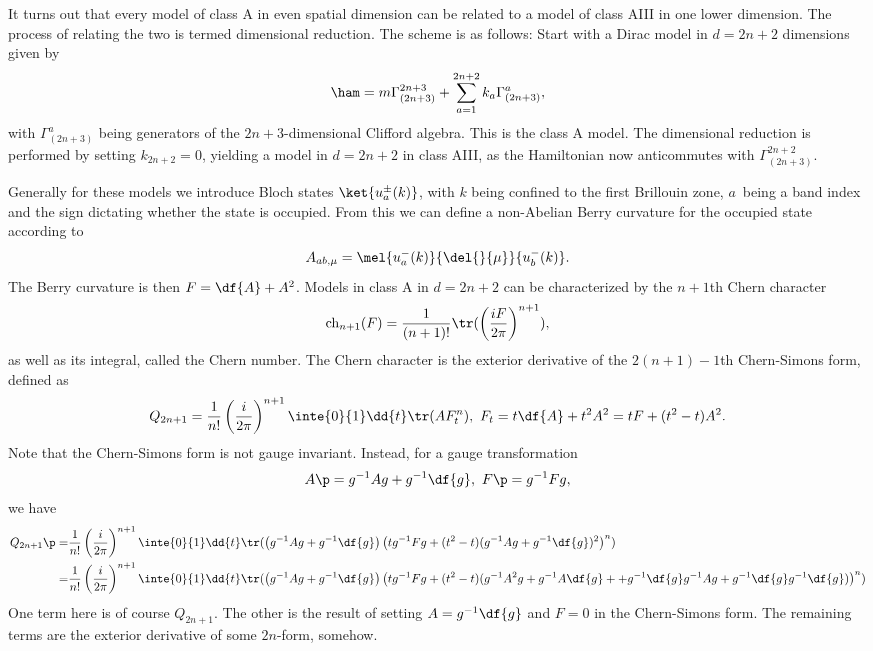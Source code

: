 It turns out that every model of class A in even spatial dimension can be related to a model of class AIII in one lower dimension. The process of relating the two is termed dimensional reduction. The scheme is as follows: Start with a Dirac model in $d = 2n + 2$ dimensions given by
\begin{align*}
	\ham = m\Gamma_{(2n + 3)}^{2n + 3} + \sum\limits_{a = 1}^{2n + 2}k_{a}\Gamma_{(2n + 3)}^{a},
\end{align*}
with $\Gamma_{(2n + 3)}^{a}$ being generators of the $2n + 3$-dimensional Clifford algebra. This is the class A model. The dimensional reduction is performed by setting $k_{2n + 2} = 0$, yielding a model in $d = 2n + 2$ in class AIII, as the Hamiltonian now anticommutes with $\Gamma_{(2n + 3)}^{2n + 2}$.

Generally for these models we introduce Bloch states $\ket{u_{a}^{\pm}(k)}$, with $k$ being confined to the first Brillouin zone, $a$ being a band index and the sign dictating whether the state is occupied. From this we can define a non-Abelian Berry curvature for the occupied state according to
\begin{align*}
	A_{ab, \mu} = \mel{u_{a}^{-}(k)}{\del{}{\mu}}{u_{b}^{-}(k)}.
\end{align*}
The Berry curvature is then $F = \df{A} + A^{2}$. Models in class A in $d = 2n + 2$ can be characterized by the $n + 1$th Chern character
\begin{align*}
	\text{ch}_{n + 1}(F) = \frac{1}{(n + 1)!}\tr(\left(\frac{iF}{2\pi}\right)^{n + 1}),
\end{align*}
as well as its integral, called the Chern number. The Chern character is the exterior derivative of the $2(n + 1) - 1$th Chern-Simons form, defined as
\begin{align*}
	Q_{2n + 1} = \frac{1}{n!}\left(\frac{i}{2\pi}\right)^{n + 1}\inte{0}{1}\dd{t}\tr(AF_{t}^{n}),\ F_{t} = t\df{A} + t^{2}A^{2} = tF + (t^{2} - t)A^{2}.
\end{align*}
Note that the Chern-Simons form is not gauge invariant. Instead, for a gauge transformation
\begin{align*}
	A\p = g^{-1}Ag + g^{-1}\df{g},\ F\p = g^{-1}Fg,
\end{align*}
we have
\begin{align*}
	Q_{2n + 1}\p =& \frac{1}{n!}\left(\frac{i}{2\pi}\right)^{n + 1}\inte{0}{1}\dd{t}\tr(\left(g^{-1}Ag + g^{-1}\df{g}\right)\left(tg^{-1}Fg + (t^{2} - t)(g^{-1}Ag + g^{-1}\df{g})^{2}\right)^{n}) \\
	             =& \frac{1}{n!}\left(\frac{i}{2\pi}\right)^{n + 1}\inte{0}{1}\dd{t}\tr(\left(g^{-1}Ag + g^{-1}\df{g}\right)\left(tg^{-1}Fg + (t^{2} - t)(g^{-1}A^{2}g + g^{-1}A\df{g} +  + g^{-1}\df{g}g^{-1}Ag + g^{-1}\df{g}g^{-1}\df{g})\right)^{n})
\end{align*}
One term here is of course $Q_{2n + 1}$. The other is the result of setting $A = g^{-1}\df{g}$ and $F = 0$ in the Chern-Simons form. The remaining terms are the exterior derivative of some $2n$-form, somehow.

